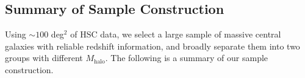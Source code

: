 \documentclass[a4paper,fleqn,usenatbib]{mnras}
\def\mhalo{{$M_{\mathrm{halo}}$}}
\newcommand{\alexie}[1]{\textcolor{blue}{\textbf{[Alexie: #1]}}}
\begin{document}

\subsection{Summary of Sample Construction}
    \label{ssec:sample}

    Using $\sim 100$ deg$^2$ of HSC data, we select a large sample of massive central 
    galaxies with reliable redshift information, and broadly separate them into two 
    groups with different \mhalo{}. 
    The following is a summary of our sample construction.
    
\end{document}
